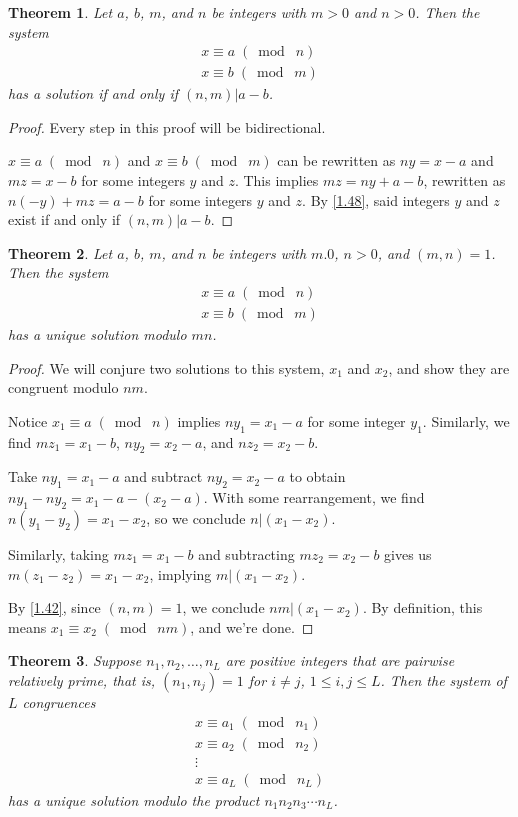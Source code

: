 \documentclass{article}
\newtheorem{thm}{Theorem}[section]
\numberwithin{equation}{thm}
\providecommand{\gmod}[1]{\; (\bmod \; #1)}
\begin{document}
\begin{thm} \label{3.27}
  Let $a$, $b$, $m$, and $n$ be integers with $m > 0$ and $n > 0$. Then the system
  \begin{gather*}
    x \equiv a \gmod n \\
    x \equiv b \gmod m
  \end{gather*}
  has a solution if and only if $(n, m) | a-b$.
\end{thm}

\begin{proof}
  Every step in this proof will be bidirectional.

  $x \equiv a \gmod n$ and $x \equiv b \gmod m$ can be rewritten as $ny = x - a$ and $mz = x - b$ for some integers $y$ and $z$. This implies $mz = ny + a - b$, rewritten as $n(-y) + mz = a - b$ for some integers $y$ and $z$. By \ref{1.48}, said integers $y$ and $z$ exist if and only if $(n, m)| a - b$.
\end{proof}



\begin{thm} \label{3.28}
  Let $a$, $b$, $m$, and $n$ be integers with $m . 0$, $n > 0$, and $(m, n) = 1$. Then the system
  \begin{gather*}
    x \equiv a \gmod n \\
    x \equiv b \gmod m
  \end{gather*}
  has a unique solution modulo $mn$.
\end{thm}

\begin{proof}
  We will conjure two solutions to this system, $x_1$ and $x_2$, and show they are congruent modulo $nm$.

  Notice $x_1 \equiv a \gmod n$ implies $ny_1 = x_1 - a$ for some integer $y_1$. Similarly, we find $mz_1 = x_1 - b$, $ny_2 = x_2 - a$, and $nz_2 = x_2 - b$.

  Take $ny_1 = x_1 - a$ and subtract $ny_2 = x_2 - a$ to obtain $ny_1 - ny_2 = x_1 - a - (x_2 - a)$. With some rearrangement, we find $n(y_1 - y_2) = x_1 - x_2$, so we conclude $n | (x_1 - x_2)$.

  Similarly, taking $mz_1 = x_1 - b$ and subtracting $mz_2 = x_2 - b$ gives us $m(z_1 - z_2) = x_1 - x_2$, implying $m | (x_1 - x_2)$.

  By \ref{1.42}, since $(n, m) = 1$, we conclude $nm | (x_1 - x_2)$. By definition, this means $x_1 \equiv x_2 \gmod{nm}$, and we're done.
\end{proof}



\begin{thm} \label{3.29}
  Suppose $n_1, n_2, \ldots, n_L$ are positive integers that are pairwise relatively prime, that is, $(n_1, n_j) = 1$ for $i \neq j$, $1 \leq i, j \leq L$. Then the system of $L$ congruences
  \begin{gather*}
    x \equiv a_1 \gmod{n_1} \\
    x \equiv a_2 \gmod{n_2} \\
    \vdots \\
    x \equiv a_L \gmod{n_L}
  \end{gather*}
  has a unique solution modulo the product $n_1n_2n_3\cdots n_L$.
\end{thm}
\end{document}
